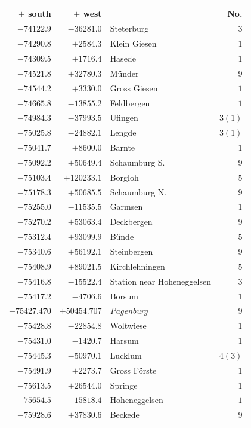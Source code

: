 \clearpage{}%
\begin{center}\begingroup\fontsize{8}{9}\selectfont
\setlength{\tabcolsep}{4pt}
\begin{tabular}{r|r|p{170pt}|r}\hline
\(+\) south&\(+\) west&&No.\\\hline
\(-74122.9\)&\(-36281.0\)&Steterburg&\(3\)\\
\(-74290.8\)&\(+2584.3\)&Klein Giesen&\(1\)\\
\(-74309.5\)&\(+1716.4\)&Hasede&\(1\)\\
\(-74521.8\)&\(+32780.3\)&Münder&\(9\)\\
\(-74544.2\)&\(+3330.0\)&Gross Giesen&\(1\)\\
\(-74665.8\)&\(-13855.2\)&Feldbergen&\(1\)\\
\(-74984.3\)&\(-37993.5\)&Ufingen&\(3 (1)\)\\
\(-75025.8\)&\(-24882.1\)&Lengde&\(3 (1)\)\\
\(-75041.7\)&\(+8600.0\)&Barnte&\(1\)\\
\(-75092.2\)&\(+50649.4\)&Schaumburg S.&\(9\)\\
\(-75103.4\)&\(+120233.1\)&Borgloh&\(5\)\\
\(-75178.3\)&\(+50685.5\)&Schaumburg N.&\(9\)\\
\(-75255.0\)&\(-11535.5\)&Garmsen&\(1\)\\
\(-75270.2\)&\(+53063.4\)&Deckbergen&\(9\)\\
\(-75312.4\)&\(+93099.9\)&Bünde&\(5\)\\
\(-75340.6\)&\(+56192.1\)&Steinbergen&\(9\)\\
\(-75408.9\)&\(+89021.5\)&Kirchlehningen&\(5\)\\
\(-75416.8\)&\(-15522.4\)&Station near Hoheneggelsen&\(3\)\\
\(-75417.2\)&\(-4706.6\)&Borsum&\(1\)\\
\(-75427.470\)&\(+50454.707\)&\textit{Pagenburg}&\(9\)\\
\(-75428.8\)&\(-22854.8\)&Woltwiese&\(1\)\\
\(-75431.0\)&\(-1420.7\)&Harsum&\(1\)\\
\(-75445.3\)&\(-50970.1\)&Lucklum&\(4 (3)\)\\
\(-75491.9\)&\(+2273.7\)&Gross Förste&\(1\)\\
\(-75613.5\)&\(+26544.0\)&Springe&\(1\)\\
\(-75654.5\)&\(-15818.4\)&Hoheneggelsen&\(1\)\\
\(-75928.6\)&\(+37830.6\)&Beckede&\(9\)\\

\end{tabular}
\end{center}
